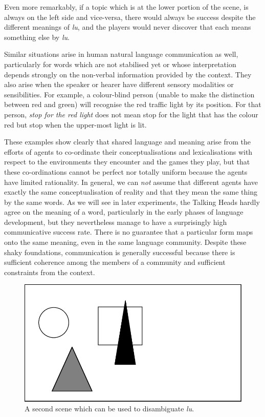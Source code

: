 \clearpage
Even more remarkably, if a topic which is at the lower
portion of the scene, is always 
on the left side and vice-versa, there would always be 
success despite the different meanings of \textit{lu}, 
and the players would never discover
that each means something else by \textit{lu}. 

Similar situations arise in human natural language communication
as well, particularly for words
which are not stabilised yet or whose interpretation 
depends strongly on the non-verbal information provided
by the context. They also arise when the speaker or hearer
have different sensory modalities or sensibilities. 
For example, a colour-blind person (unable to 
make the distinction between red and green) will recognise
the red traffic light by its position. For that person, 
\textit{stop for the red light} does not mean stop for 
the light that has the colour red but stop when the 
upper-most light is lit. 

These examples show clearly that shared language and meaning 
arise from the efforts of agents to co-ordinate their
conceptualisations and lexicalisations with respect 
to the environments they encounter and the games they play, 
but that these co-ordinations cannot be perfect nor totally 
uniform because the agents have limited rationality. 
In general, we can {\itshape not} assume that different agents
have exactly the same 
conceptualisation of reality and that they mean the same thing by 
the same words. As we will see in later experiments, the
Talking Heads hardly agree on the meaning of a word, particularly 
in the early phases of language development, but they 
nevertheless manage to have a surprisingly high communicative success
rate. There is no guarantee that a particular 
form maps onto the same meaning, even in the same language community.
Despite these shaky foundations, communication is generally 
successful because there is sufficient coherence among the members of 
a community and sufficient constraints from the context. 


\begin{figure}[htbp]
  \centerline{\includegraphics[width=.50\textwidth]{chap2/figs/scene1-2.pdf}}
\caption{\label{scene1-2}A second scene which 
can be used to disambiguate \textit{lu}.}
\end{figure}

